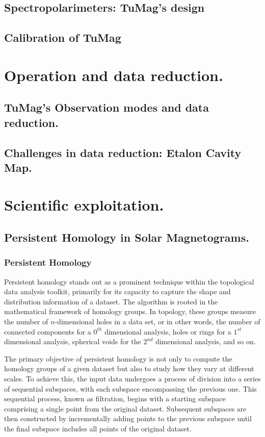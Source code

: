 \documentclass[12pt]{mythesis}
\begin{document}
\section{Spectropolarimeters: TuMag's design}
\section{Calibration of TuMag}

\chapter{Operation and data reduction.}

\section{TuMag's Observation modes and data reduction.}
\section{Challenges in data reduction: Etalon Cavity Map.}

\chapter{Scientific exploitation.}




\section{Persistent Homology in Solar Magnetograms.}

\subsection{Persistent Homology}

Persistent homology stands out as a prominent technique within the topological data analysis toolkit, primarily for its capacity to capture the shape and distribution information of a dataset. The algorithm is rooted in the mathematical framework of homology groups. In topology, these groups measure the number of $n$-dimensional holes in a data set, or in other words, the number of connected components for a  $0^{th}$ dimensional analysis, holes or rings for a $1^{st}$ dimensional analysis, spherical voids for the $2^{nd}$ dimensional analysis, and so on. 

The primary objective of persistent homology is not only to compute the homology groups of a given dataset but also to study how they vary at different scales. To achieve this, the input data undergoes a process of division into a series of sequential subspaces, with each subspace encompassing the previous one. This sequential process, known as filtration, begins with a starting subspace comprising a single point from the original dataset. Subsequent subspaces are then constructed by incrementally adding points to the previous subspace until the final subspace includes all points of the original dataset. 
\end{document}
